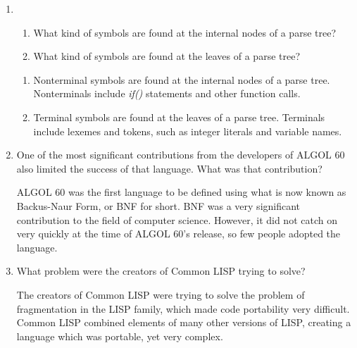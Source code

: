 \begin{enumerate}
  \item
  \begin{enumerate}
    \item What kind of symbols are found at the internal nodes of a
      parse tree?
    \item What kind of symbols are found at the leaves of a parse tree?
    \end{enumerate}

  \begin{answer}

  \begin{enumerate}
    \item Nonterminal symbols are found at the internal nodes of a
      parse tree. Nonterminals include \textit{if()} statements and
      other function calls.
    \item Terminal symbols are found at the leaves of a parse
      tree. Terminals include lexemes and tokens, such as integer
      literals and variable names.
    \end{enumerate}

    \end{answer}


  \item One of the most significant contributions from the developers
    of ALGOL 60 also limited the success of that language. What was
    that contribution?

  \begin{answer}

    ALGOL 60 was the first language to be defined using what is now
    known as Backus-Naur Form, or BNF for short. BNF was a very
    significant contribution to the field of computer
    science. However, it did not catch on very quickly at the time of
    ALGOL 60's release, so few people adopted the language.

    \end{answer}

  \item What problem were the creators of Common LISP trying to solve?

  \begin{answer}

    The creators of Common LISP were trying to solve the problem of
    fragmentation in the LISP family, which made code portability very
    difficult. Common LISP combined elements of many other versions of
    LISP, creating a language which was portable, yet very complex.

    \end{answer}


\end{enumerate}
